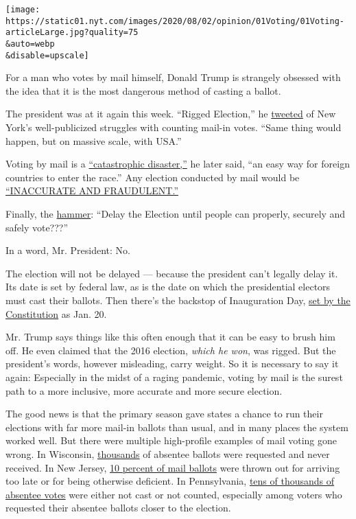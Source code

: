 \texttt{[image: https://static01.nyt.com/images/2020/08/02/opinion/01Voting/01Voting-articleLarge.jpg?quality=75\\\&auto=webp\\\&disable=upscale]}

For a man who votes by mail himself, Donald Trump is strangely obsessed
with the idea that it is the most dangerous method of casting a ballot.

The president was at it again this week. ``Rigged Election,'' he
\href{https://twitter.com/realDonaldTrump/status/1288602262567153664}{tweeted}
of New York's well-publicized struggles with counting mail-in votes.
``Same thing would happen, but on massive scale, with USA.''

Voting by mail is a
\href{https://twitter.com/realDonaldTrump/status/1288809157722877952}{``catastrophic
disaster,''} he later said, ``an easy way for foreign countries to enter
the race.'' Any election conducted by mail would be
\href{https://twitter.com/realDonaldTrump/status/1288818160389558273}{``INACCURATE
AND FRAUDULENT.''}

Finally, the
\href{https://twitter.com/realDonaldTrump/status/1288818160389558273}{hammer}:
``Delay the Election until people can properly, securely and safely
vote???''

In a word, Mr. President: No.

The election will not be delayed --- because the president can't legally
delay it. Its date is set by federal law, as is the date on which the
presidential electors must cast their ballots. Then there's the backstop
of Inauguration Day,
\href{https://constitutioncenter.org/interactive-constitution/amendment/amendment-xx}{set
by the Constitution} as Jan. 20.

Mr. Trump says things like this often enough that it can be easy to
brush him off. He even claimed that the 2016 election, \emph{which he
won}, was rigged. But the president's words, however misleading, carry
weight. So it is necessary to say it again: Especially in the midst of a
raging pandemic, voting by mail is the surest path to a more inclusive,
more accurate and more secure election.

The good news is that the primary season gave states a chance to run
their elections with far more mail-in ballots than usual, and in many
places the system worked well. But there were multiple high-profile
examples of mail voting gone wrong. In Wisconsin,
\href{https://www.nytimes.com/2020/04/09/us/politics/wisconsin-election-absentee-coronavirus.html}{thousands}
of absentee ballots were requested and never received. In New Jersey,
\href{https://www.njspotlight.com/2020/06/one-in-10-ballots-rejected-in-last-months-vote-by-mail-elections/}{10
percent of mail ballots} were thrown out for arriving too late or for
being otherwise deficient. In Pennsylvania,
\href{https://www.inquirer.com/politics/election/pa-mail-ballot-deadlines-disenfranchisement-20200730.html}{tens
of thousands of absentee votes} were either not cast or not counted,
especially among voters who requested their absentee ballots closer to
the election.

